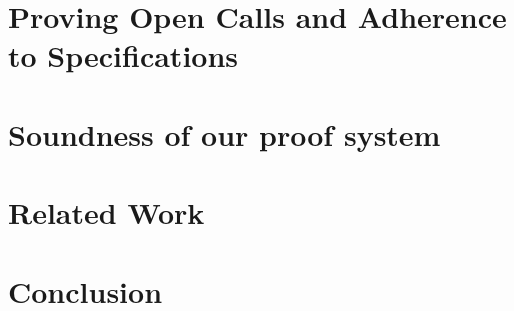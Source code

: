 \documentclass[acmsmall,review,anonymous,screen]{acmart}\settopmatter{printfolios=true,printacmref=false}
\begin{document}

\section{Proving Open Calls and Adherence to \SpecLang Specifications}
\label{sect:proofSystem}
 
 
 \section{Soundness of our proof system}
 \label{sect:sound:proofSystem}


 \section{Related Work}
 \label{sect:related}
 

\section{Conclusion}
\label{sect:conclusion}
  





%
% 
%
% 

  


%

\clearpage
\end{document}
